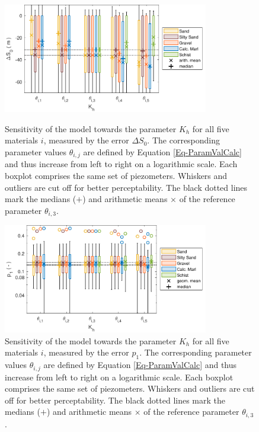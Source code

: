 \begin{figure}[p]
    \centering
    \includegraphics[width=0.8\textwidth]{./img/Fig-SensAna-K_h-DeltaS_0.pdf}
    \caption{Sensitivity of the model towards the parameter $K_h$ for all five materials $i$, measured by the error $\Delta S_0$. The corresponding parameter values $\theta_{i,j}$ are defined by Equation \eqref{Eq-ParamValCalc} and thus increase from left to right on a logarithmic scale. Each boxplot comprises the same set of piezometers. Whiskers and outliers are cut off for better perceptability. The black dotted lines mark the medians ($\bm{+}$) and arithmetic means $\bm{\times}$ of the reference parameter $\theta_{i,3}$.}
    \label{Fig-SAKhDeltaS0}

    \includegraphics[width=0.8\textwidth]{./img/Fig-SensAna-K_h-p_1.pdf}
    \caption{Sensitivity of the model towards the parameter $K_h$ for all five materials $i$, measured by the error $p_1$. The corresponding parameter values $\theta_{i,j}$ are defined by Equation \eqref{Eq-ParamValCalc} and thus increase from left to right on a logarithmic scale. Each boxplot comprises the same set of piezometers. Whiskers and outliers are cut off for better perceptability. The black dotted lines mark the medians ($\bm{+}$) and arithmetic means $\bm{\times}$ of the reference parameter $\theta_{i,3}$.}
    \label{Fig-SAKhp1}
\end{figure}

